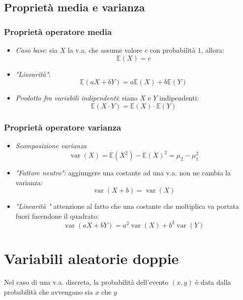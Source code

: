 \subsection{Proprietà media e varianza}
\subsubsection*{Proprietà operatore media}
\begin{itemize}
	\item \textit{Caso base}: sia $ X $ la v.a. che assume valore $ c $  con probabilità $ 1 $, allora:
	      \[
		      \mathbb{E}\left(X\right) = c
	      \]
	\item \textit{"Linearità"}:
	      \[
		      \mathbb{E}\left(a X + b Y\right) = a\mathbb{E}\left(X\right) + b \mathbb{E}\left(Y\right)
	      \]
	\item \textit{Prodotto fra variabili indipendenti}: siano $ X $ e $ Y $ indipendenti:
	      \[
		      \mathbb{E}\left(X \cdot Y\right)= \mathbb{E}\left(X\right)\cdot \mathbb{E}\left(Y\right)
	      \]
\end{itemize}
\subsubsection*{Proprietà operatore varianza}
\begin{itemize}
	\item \textit{Scomposizione varianza}
	      \[
		      \operatorname{var}\left(X \right) = \mathbb{E} \left(X^2 \right) - \mathbb{E}\left(X\right)^2 = \mu _2 - \mu _1^2
	      \]
	\item \textit{"Fattore neutro"}: aggiungere una costante ad una v.a. non ne cambia la varianza:
	      \[
		      \operatorname{var}\left(X + b\right) = \operatorname{var}\left(X\right)
	      \]
	\item \textit{"Linearità "} attenzione al fatto che una costante che moltiplica va portata fuori facendone il quadrato:
	      \[
		      \operatorname{var} \left(aX + bY\right) = a^2  \operatorname{var}\left(X\right) + b^2  \operatorname{var}\left(Y\right)
	      \]
\end{itemize}
\section{Variabili aleatorie doppie}
Nel caso di una v.a. discreta, la probabilità dell'evento $ \left(x,y\right) $ è data dalla probabilità che avvengano sia $ x $ che $ y $
